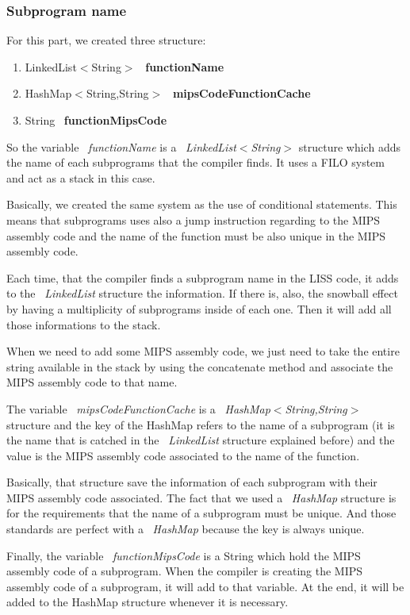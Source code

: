 \documentclass[
  oneside,
  11pt, a4paper,
  footinclude=true,
  headinclude=true,
  cleardoublepage=empty
]{scrbook}
\begin{document}
\subsubsection{Subprogram name}

For this part, we created three structure:

\begin{enumerate}
\item LinkedList$<$String$>$ ~\textbf{functionName}
\item HashMap$<$String,String$>$ ~\textbf{mipsCodeFunctionCache}
\item String ~\textbf{functionMipsCode}
\end{enumerate}

So the variable ~\textit{functionName} is a ~\textit{LinkedList$<$String$>$} structure which adds the name of each subprograms that the compiler finds. It uses a FILO system and act as a stack in this case.

Basically, we created the same system  as the use of conditional statements. This means that subprograms uses also a jump instruction regarding to the MIPS assembly code and the name of the function must be also unique in the MIPS assembly code.

Each time, that the compiler finds a subprogram name in the LISS code, it adds to the ~\textit{LinkedList} structure the information. If there is, also, the snowball effect by having a multiplicity of subprograms inside of each one. Then it will add all those informations to the stack.

When we need to add some MIPS assembly code, we just need to take the entire string available in the stack by using the concatenate method and associate the MIPS assembly code to that name.

The variable ~\textit{mipsCodeFunctionCache} is a ~\textit{HashMap$<$String,String$>$} structure and the key of the HashMap refers to the name of a subprogram (it is the name that is catched in the ~\textit{LinkedList} structure explained before) and the value is the MIPS assembly code associated to the name of the function.

Basically, that structure save the information of each subprogram with their MIPS assembly code associated. The fact that we used a ~\textit{HashMap} structure is for the requirements that the name of a subprogram must be unique. And those standards are perfect with a ~\textit{HashMap} because the key is always unique.

Finally, the variable ~\textit{functionMipsCode} is a String which hold the MIPS assembly code of a subprogram. When the compiler is creating the MIPS assembly code of a subprogram, it will add to that variable. At the end, it will be added to the HashMap structure whenever it is necessary.
\end{document}
